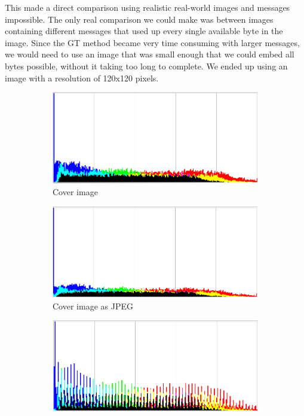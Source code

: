 This made a direct comparison using realistic real-world images and messages impossible. 
The only real comparison we could make was between images containing different messages that used up every single available byte in the image.
Since the GT method became very time consuming with larger messages, we would need to use an image that was small enough that we could embed all bytes possible, without it taking too long to complete.
We ended up using an image with a resolution of 120x120 pixels.

\begin{figure}
    \centering
    \begin{subfigure}[b]{0.49\textwidth}
        \includegraphics[width=\textwidth]{figures/tiger_smallHisto.png}
            \caption{Cover image}
            \label{fig:coverHisto}
    \end{subfigure}
    \begin{subfigure}[b]{0.49\textwidth}
            \includegraphics[width=\textwidth]{figures/gtOut2Histo.png}
            \caption{Cover image as JPEG}
            \label{fig:gt2Histo}
    \end{subfigure}
    \begin{subfigure}[b]{0.49\textwidth}
            \includegraphics[width=\textwidth]{figures/lsbOutHisto.png}

\end{subfigure}
\end{figure}
